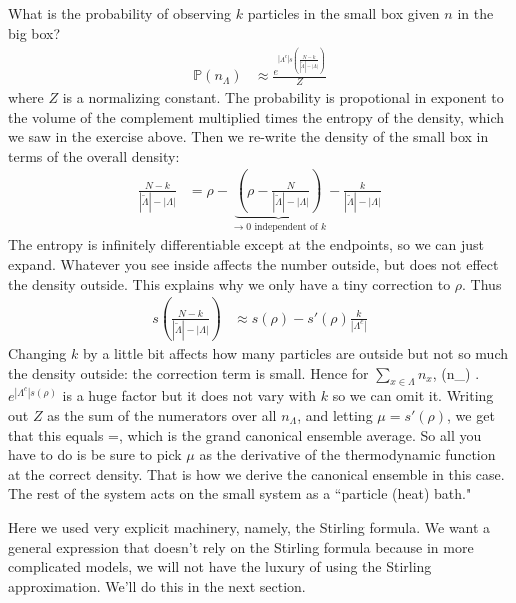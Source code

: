 \documentclass[12pt]{book}
\theoremstyle{norm}
\begin{document}
What is the probability of observing $k$ particles in the small box given $n$ in the big box?
\begin{align*}
\mathbb{P}(n_{\Lambda}) &\approx \frac{e^{|\Lambda^c|s\left( {\frac{N-k}{|\widetilde{\Lambda}| - |\Lambda|}} \right)}}{Z} %
\end{align*}
where $Z$ is a normalizing constant. The probability is propotional in exponent to the volume of the complement multiplied times the entropy of the density, which we saw in the exercise above. Then we re-write the density of the small box in terms of the overall density: 
\begin{align*}
\frac{N-k}{|\widetilde{\Lambda}|-|\Lambda|}&=\rho - \underbrace{\left( {\rho - \frac{N}{|\widetilde{\Lambda} | - |\Lambda|}} \right)}_{\to 0 \text{ independent of $k$}} -
\frac{k}{|\widetilde{\Lambda}|-|\Lambda|}
\end{align*}
The entropy is infinitely differentiable except at the endpoints, so we can just expand. Whatever you see inside affects the number outside, but does not effect the density outside. This explains why we only have a tiny correction to $\rho$. Thus 
\begin{align*}
s\left( {\frac{N-k}{|\widetilde{\Lambda}|-|\Lambda|}} \right) & \approx s(\rho) - s'(\rho)\frac{k}{|\Lambda^c|}
\end{align*}
Changing $k$ by a little bit affects how many particles are outside but not so much the density outside: the correction term is small. Hence for $\sum_{x\in \Lambda}n_x$,
\be
{}(n_\Lambda) \approx {}.
\ee
$e^{|\Lambda^c|s(\rho)}$ is a huge factor but it does not vary with $k$ so we can omit it. Writing out $Z$ as the sum of the numerators over all $n_\Lambda$,  and letting $\mu = s'(\rho)$, we get that this equals
\be
=,
\ee
which is the grand canonical ensemble average.
So all you have to do is be sure to pick $\mu$ as the derivative of the thermodynamic function at the correct density. That is how we derive the canonical ensemble in this case. 
The rest of the system acts on the small system as a ``particle (heat) bath."

Here we used very explicit machinery, namely, the Stirling formula. We want a general expression that doesn't rely on the Stirling formula because in more complicated models, we will not have the luxury of using the Stirling approximation. We'll do this in the next section.
\end{document}
